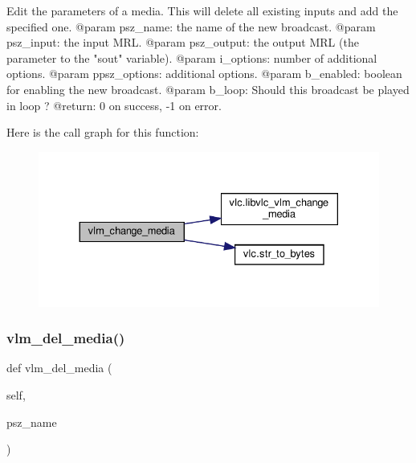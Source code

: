 \begin{DoxyVerb}Edit the parameters of a media. This will delete all existing inputs and
add the specified one.
@param psz_name: the name of the new broadcast.
@param psz_input: the input MRL.
@param psz_output: the output MRL (the parameter to the "sout" variable).
@param i_options: number of additional options.
@param ppsz_options: additional options.
@param b_enabled: boolean for enabling the new broadcast.
@param b_loop: Should this broadcast be played in loop ?
@return: 0 on success, -1 on error.
\end{DoxyVerb}
 Here is the call graph for this function\+:
\nopagebreak
\begin{figure}[H]
\begin{center}
\leavevmode
\includegraphics[width=330pt]{classvlc_1_1_instance_a58e7917b82e1cf76c6f2cd73cbcf7cfe_cgraph}
\end{center}
\end{figure}
\mbox{\label{classvlc_1_1_instance_a24a1e2bc7e41b02303d2f397246da726}} 
\subsubsection{\texorpdfstring{vlm\+\_\+del\+\_\+media()}{vlm\_del\_media()}}
{\footnotesize\ttfamily def vlm\+\_\+del\+\_\+media (\begin{DoxyParamCaption}\item[{}]{self,  }\item[{}]{psz\+\_\+name }\end{DoxyParamCaption})}

